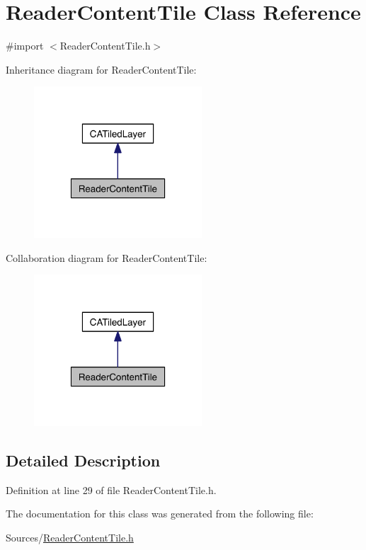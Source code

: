 \hypertarget{interface_reader_content_tile}{\section{Reader\-Content\-Tile Class Reference}
\label{d4/dec/interface_reader_content_tile}
}


{\ttfamily \#import $<$Reader\-Content\-Tile.\-h$>$}



Inheritance diagram for Reader\-Content\-Tile\-:
\nopagebreak
\begin{figure}[H]
\begin{center}
\leavevmode
\includegraphics[width=178pt]{d6/d88/interface_reader_content_tile__inherit__graph}
\end{center}
\end{figure}


Collaboration diagram for Reader\-Content\-Tile\-:
\nopagebreak
\begin{figure}[H]
\begin{center}
\leavevmode
\includegraphics[width=178pt]{de/d63/interface_reader_content_tile__coll__graph}
\end{center}
\end{figure}


\subsection{Detailed Description}


Definition at line 29 of file Reader\-Content\-Tile.\-h.



The documentation for this class was generated from the following file\-:\begin{DoxyCompactItemize}
\item 
Sources/\hyperlink{_reader_content_tile_8h}{Reader\-Content\-Tile.\-h}\end{DoxyCompactItemize}
